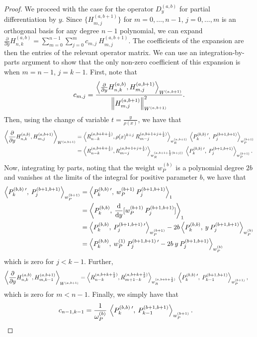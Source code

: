 \documentclass[11pt, oneside]{article}   	%
\newcommand{\half}{\frac{1}{2}}
\newcommand{\ddy}{\frac{\mathrm{d}}{\mathrm{d}y}}
\newcommand{\pddy}{\frac{\partial}{\partial y}}
\newcommand{\hdop}{H}
\newcommand{\hdopnkab}{\hdop_{n,k}^{(a,b)}}
\newcommand{\genjac}{R}
\newcommand{\genjacnmk}{\genjac_{n-k}}
\newcommand{\genjacmmj}{\genjac_{m-j}}
\newcommand{\genjacw}{w_\genjac}
\newcommand{\normjac}{\omega_P}
\begin{document}
\begin{proof}
We proceed with the case for the operator $D_y^{(a,b)}$ for partial differentiation by $y$. Since $\{\hdop^{(a, b+1)}_{m,j}\}$ for $m = 0,\dots,n-1$, $j = 0,\dots,m$ is an orthogonal basis for any degree $n-1$ polynomial, we can expand $\pddy \hdopnkab = \sum_{m=0}^{n-1} \sum_{j=0}^m c_{m,j} \: \hdop^{(a, b+1)}_{m,j}$. The coefficients of the expansion are then the entries of the relevant operator matrix. We can use an integration-by-parts argument to show that the only non-zero coefficient of this expansion is when $m = n-1$, $j = k-1$. First, note that
\begin{align*}
	c_{m,j} = \frac{\ip<\pddy \hdopnkab, \hdop^{(a, b+1)}_{m,j} >_{W^{(a, b+1)}}}{\norm{\hdop^{(a, b+1)}_{m,j}}^2_{W^{(a, b+1)}}}.
\end{align*}
Then, using the change of variable $t = \frac{y}{\rho(x)}$, we have that
\begin{align*}
	\ip<\pddy \hdopnkab, \hdop^{(a, b+1)}_{m,j} >_{W^{(a, b+1)}} &= \ip< \genjacnmk^{(a,b+k+\half)}, \rho(x)^{k+j} \: \genjacmmj^{(a,b+1+j+\half)} >_{\genjacw^{(a,b+1)}} \: \ip< P_k^{(b,b) \: \prime}, \: P_{j}^{(b+1,b+1)} >_{w_P^{(b+1)}} \\
	&= \ip< \genjacnmk^{(a,b+k+\half)}, \genjacmmj^{(a,b+1+j+\half)} >_{\genjacw^{(a,b+1+\half(k+j))}} \: \ip< P_k^{(b,b) \: \prime}, \: P_{j}^{(b+1,b+1)} >_{w_P^{(b+1)}}.
\end{align*}
Now, integrating by parts, noting that the weight $w_P^{(b)}$ is a polynomial degree $2b$ and vanishes at the limits of the integral for positive parameter $b$, we have that
\begin{align*}
	\ip< P_k^{(b,b) \: \prime}, \: P_{j}^{(b+1,b+1)} >_{w_P^{(b+1)}} &= \ip< P_k^{(b,b) \: \prime}, \: w_P^{(b+1)} \: P_{j}^{(b+1,b+1)} >_1 \\
	&= \ip< P_k^{(b,b)}, \: \ddy [w_P^{(b+1)} \: P_{j}^{(b+1,b+1)}] >_1 \\
	&= \ip< P_k^{(b,b)}, \: P_{j}^{(b+1,b+1) \: \prime} >_{w_P^{(b+1)}} - 2 b \ip< P_k^{(b,b)}, \: y \: P_{j}^{(b+1,b+1)} >_{w_P^{(b)}} \\
	&= \ip< P_k^{(b,b)}, \: w_P^{(1)} \: P_{j}^{(b+1,b+1) \: \prime} -2b \:y \: P_{j}^{(b+1,b+1)} >_{w_P^{(b)}} 
\end{align*}
which is zero for $j < k-1$. Further,
\begin{align*}
	\ip<\pddy \hdopnkab, \hdop^{(a, b+1)}_{m,k-1} >_{W^{(a, b+1)}} &= \ip< \genjacnmk^{(a,b+k+\half)}, \genjac_{m+1-k}^{(a,b+k+\half)} >_{\genjacw^{(a,b+k+\half)}} \: \ip< P_k^{(b,b) \: \prime}, \: P_{k-1}^{(b+1,b+1)} >_{w_P^{(b+1)}},
\end{align*}
which is zero for $m < n-1$. Finally, we simply have that
\begin{align*}
	c_{n-1,k-1} &= \frac{1}{\normjac^{(b)}} \: \ip< P_k^{(b,b) \: \prime}, \: P_{k-1}^{(b+1,b+1)} >_{w_P^{(b+1)}}.
\end{align*}


\end{proof}
\end{document}
